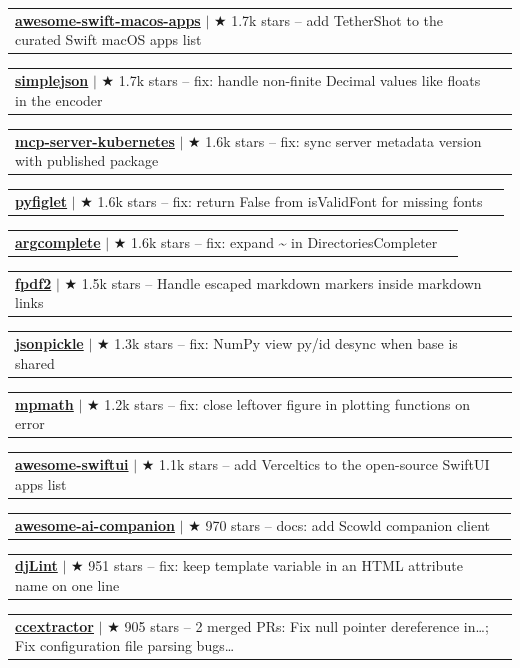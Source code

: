 \documentclass[letterpaper,11pt]{article}
\makeatletter
\newcommand{\resumeProjectHeading}[2]{
    \item
    \begin{tabular*}{0.97\textwidth}{l@{\extracolsep{\fill}}r}
      \small#1 & \hspace{8pt}\small#2 \\
    \end{tabular*}\vspace{-11.4pt}
}
\makeatother
\begin{document}
      \resumeProjectHeading{\textbf{\href{https://github.com/jaywcjlove/awesome-swift-macos-apps/pull/101}{awesome-swift-macos-apps}} $|$ {\small $\bigstar$ 1.7k stars} \textnormal{ -- add TetherShot to the curated Swift macOS apps list}}{}
      \resumeProjectHeading{\textbf{\href{https://github.com/simplejson/simplejson/pull/381}{simplejson}} $|$ {\small $\bigstar$ 1.7k stars} \textnormal{ -- fix: handle non-finite Decimal values like floats in the encoder}}{}
      \resumeProjectHeading{\textbf{\href{https://github.com/Flux159/mcp-server-kubernetes/pull/320}{mcp-server-kubernetes}} $|$ {\small $\bigstar$ 1.6k stars} \textnormal{ -- fix: sync server metadata version with published package}}{}
      \resumeProjectHeading{\textbf{\href{https://github.com/pwaller/pyfiglet/pull/161}{pyfiglet}} $|$ {\small $\bigstar$ 1.6k stars} \textnormal{ -- fix: return False from isValidFont for missing fonts}}{}
      \resumeProjectHeading{\textbf{\href{https://github.com/kislyuk/argcomplete/pull/553}{argcomplete}} $|$ {\small $\bigstar$ 1.6k stars} \textnormal{ -- fix: expand \textasciitilde{} in DirectoriesCompleter}}{}
      \resumeProjectHeading{\textbf{\href{https://github.com/py-pdf/fpdf2/pull/1883}{fpdf2}} $|$ {\small $\bigstar$ 1.5k stars} \textnormal{ -- Handle escaped markdown markers inside markdown links}}{}
      \resumeProjectHeading{\textbf{\href{https://github.com/jsonpickle/jsonpickle/pull/612}{jsonpickle}} $|$ {\small $\bigstar$ 1.3k stars} \textnormal{ -- fix: NumPy view py/id desync when base is shared}}{}
      \resumeProjectHeading{\textbf{\href{https://github.com/mpmath/mpmath/pull/1123}{mpmath}} $|$ {\small $\bigstar$ 1.2k stars} \textnormal{ -- fix: close leftover figure in plotting functions on error}}{}
      \resumeProjectHeading{\textbf{\href{https://github.com/onmyway133/awesome-swiftui/pull/59}{awesome-swiftui}} $|$ {\small $\bigstar$ 1.1k stars} \textnormal{ -- add Verceltics to the open-source SwiftUI apps list}}{}
      \resumeProjectHeading{\textbf{\href{https://github.com/DasterProkio/awesome-ai-companion/pull/10}{awesome-ai-companion}} $|$ {\small $\bigstar$ 970 stars} \textnormal{ -- docs: add Scowld companion client}}{}
      \resumeProjectHeading{\textbf{\href{https://github.com/djlint/djLint/pull/2206}{djLint}} $|$ {\small $\bigstar$ 951 stars} \textnormal{ -- fix: keep template variable in an HTML attribute name on one line}}{}
      \resumeProjectHeading{\textbf{\href{https://github.com/CCExtractor/ccextractor/pulls?q=is\%3Apr\%20is\%3Amerged\%20author\%3Aapoorvdarshan}{ccextractor}} $|$ {\small $\bigstar$ 905 stars} \textnormal{ -- 2 merged PRs: Fix null pointer dereference in…; Fix configuration file parsing bugs…}}{}
\end{document}
